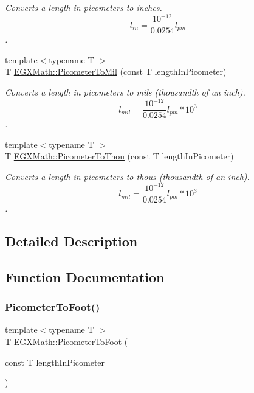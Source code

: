 \begin{DoxyCompactItemize}
\begin{DoxyCompactList}\small\item\em Converts a length in picometers to inches. \[ l_{in}= \frac{10^{-12}}{0.0254} l_{pm} \]. \end{DoxyCompactList}\item 
{\footnotesize template$<$typename T $>$ }\\T \mbox{\hyperlink{group___e_g_x_math-_conversions-_length_conversions-_s_i-_picometer-_imperial_ga727778c82b4049ff45091f492993150d}{E\+G\+X\+Math\+::\+Picometer\+To\+Mil}} (const T length\+In\+Picometer)
\begin{DoxyCompactList}\small\item\em Converts a length in picometers to mils (thousandth of an inch). \[ l_{mil}= \frac{10^{-12}}{0.0254} l_{pm} * 10^{3} \]. \end{DoxyCompactList}\item 
{\footnotesize template$<$typename T $>$ }\\T \mbox{\hyperlink{group___e_g_x_math-_conversions-_length_conversions-_s_i-_picometer-_imperial_gabf48007bf90e25f6d23f847101fd35f1}{E\+G\+X\+Math\+::\+Picometer\+To\+Thou}} (const T length\+In\+Picometer)
\begin{DoxyCompactList}\small\item\em Converts a length in picometers to thous (thousandth of an inch). \[ l_{mil}= \frac{10^{-12}}{0.0254} l_{pm} * 10^{3} \]. \end{DoxyCompactList}\end{DoxyCompactItemize}


\subsection{Detailed Description}


\subsection{Function Documentation}
\mbox{\label{group___e_g_x_math-_conversions-_length_conversions-_s_i-_picometer-_imperial_gae83808c99fe5c49c54717302f667ff46}} 
\subsubsection{\texorpdfstring{Picometer\+To\+Foot()}{PicometerToFoot()}}
{\footnotesize\ttfamily template$<$typename T $>$ \\
T E\+G\+X\+Math\+::\+Picometer\+To\+Foot (\begin{DoxyParamCaption}\item[{const T}]{length\+In\+Picometer }\end{DoxyParamCaption})}



